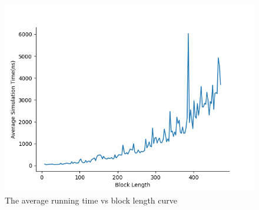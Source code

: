 \begin{figure}
	\includegraphics*[height = 0.4 \textheight]{graphic/primarytime.png}
	\caption{The average running time vs block length curve}
\end{figure}
\newpage